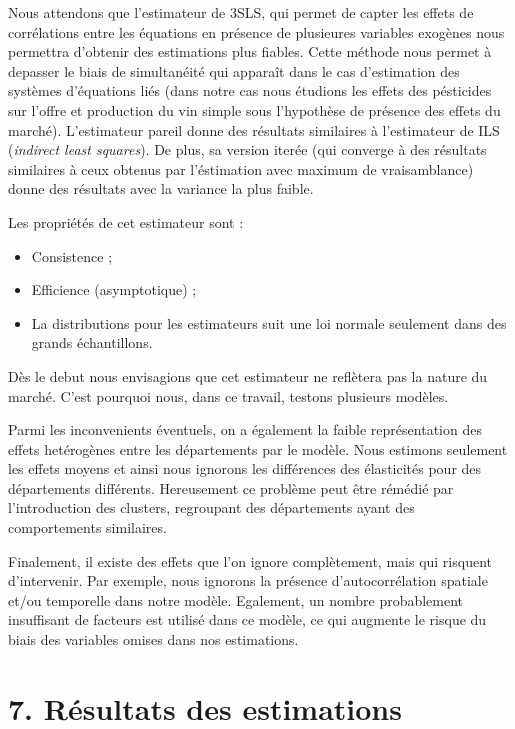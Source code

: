 \documentclass[11pt,]{article}
\providecommand{\tightlist}{%
  \setlength{\itemsep}{0pt}\setlength{\parskip}{0pt}}
\begin{document}
Nous attendons que l'estimateur de 3SLS, qui permet de capter les effets
de corrélations entre les équations en présence de plusieures variables
exogènes nous permettra d'obtenir des estimations plus fiables. Cette
méthode nous permet à depasser le biais de simultanéité qui apparaît
dans le cas d'estimation des systèmes d'équations liés (dans notre cas
nous étudions les effets des pésticides sur l'offre et production du vin
simple sous l'hypothèse de présence des effets du marché). L'estimateur
pareil donne des résultats similaires à l'estimateur de ILS
(\emph{indirect least squares}). De plus, sa version iterée (qui
converge à des résultats similaires à ceux obtenus par l'éstimation avec
maximum de vraisamblance) donne des résultats avec la variance la plus
faible.

Les propriétés de cet estimateur sont :

\begin{itemize}
\tightlist
\item
  Consistence ;
\item
  Efficience (asymptotique) ;
\item
  La distributions pour les estimateurs suit une loi normale seulement
  dans des grands échantillons.
\end{itemize}

Dès le debut nous envisagions que cet estimateur ne reflètera pas la
nature du marché. C'est pourquoi nous, dans ce travail, testons
plusieurs modèles.

Parmi les inconvenients éventuels, on a également la faible
représentation des effets hetérogènes entre les départements par le
modèle. Nous estimons seulement les effets moyens et ainsi nous ignorons
les différences des élasticités pour des départements différents.
Hereusement ce problème peut être rémédié par l'introduction des
clusters, regroupant des départements ayant des comportements
similaires.

Finalement, il existe des effets que l'on ignore complètement, mais qui
risquent d'intervenir. Par exemple, nous ignorons la présence
d'autocorrélation spatiale et/ou temporelle dans notre modèle.
Egalement, un nombre probablement insuffisant de facteurs est utilisé
dans ce modèle, ce qui augmente le risque du biais des variables omises
dans nos estimations.

\hypertarget{resultats-des-estimations}{%
\section{7. Résultats des estimations}\label{resultats-des-estimations}}
\end{document}
